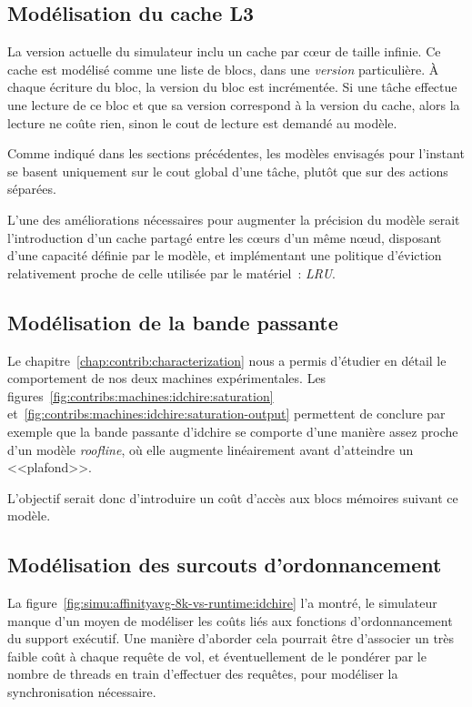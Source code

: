 \subsection{Modélisation du cache L3}

La version actuelle du simulateur inclu un cache par cœur de taille infinie.
Ce cache est modélisé comme une liste de blocs, dans une \emph{version} particulière.
À chaque écriture du bloc, la version du bloc est incrémentée.
Si une tâche effectue une lecture de ce bloc et que sa version correspond à la version du cache, alors la lecture ne coûte rien, sinon le cout de lecture est demandé au modèle.

Comme indiqué dans les sections précédentes, les modèles envisagés pour l'instant se basent uniquement sur le cout global d'une tâche, plutôt que sur des actions séparées.

L'une des améliorations nécessaires pour augmenter la précision du modèle serait l'introduction d'un cache partagé entre les cœurs d'un même nœud, disposant d'une capacité définie par le modèle, et implémentant une politique d'éviction relativement proche de celle utilisée par le matériel~: \emph{LRU}.

\subsection{Modélisation de la bande passante}

Le chapitre~\ref{chap:contrib:characterization} nous a permis d'étudier en détail le comportement de nos deux machines expérimentales.
Les figures~\ref{fig:contribs:machines:idchire:saturation} et~\ref{fig:contribs:machines:idchire:saturation-output} permettent de conclure par exemple que la bande passante d'idchire se comporte d'une manière assez proche d'un modèle \emph{roofline}, où elle augmente linéairement avant d'atteindre un <<plafond>>.

L'objectif serait donc d'introduire un coût d'accès aux blocs mémoires suivant ce modèle.

\subsection{Modélisation des surcouts d'ordonnancement}

La figure~\ref{fig:simu:affinityavg-8k-vs-runtime:idchire} l'a montré, le simulateur manque d'un moyen de modéliser les coûts liés aux fonctions d'ordonnancement du support exécutif.
Une manière d'aborder cela pourrait être d'associer un très faible coût à chaque requête de vol, et éventuellement de le pondérer par le nombre de threads en train d'effectuer des requêtes, pour modéliser la synchronisation nécessaire.

